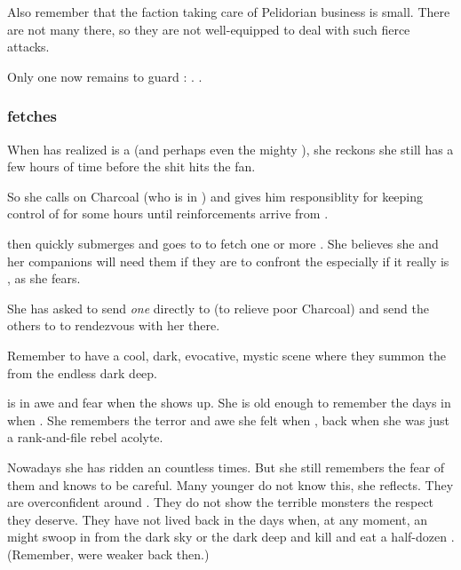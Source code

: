 Also remember that the faction taking care of Pelidorian business is small. 
There are not many \resphain there, so they are not well-equipped to deal with such fierce \dragon attacks.

Only one \resphan{} now remains to guard \Malcur: \Paerzim. 
. 





\subsubsection{\Achsah fetches \umbrae}
When \Achsah{} has realized \Takestsha{} is a \dragon{} (and perhaps even the mighty \Nzessuacrith), she reckons she still has a few hours of time before the shit hits the fan. 

So she calls on Charcoal (who is in \Forclin) and gives him responsiblity for keeping control of \Forclin{} for some hours until reinforcements arrive from \Malcur. 

\Achsah{} then quickly submerges and goes to \Nyx{} to fetch one or more \umbrae. 
She believes she and her companions will need them if they are to confront the \dragon\dash especially if it really is \Nzessuacrith, as she fears. 

She has asked \Teshrial{} to send \emph{one} \resphan{} directly to \Forclin{} (to relieve poor Charcoal) and send the others to \Nyx{} to rendezvous with her there. 

Remember to have a cool, dark, evocative, mystic scene where they summon the \umbrae{} from the endless dark deep. 

\Achsah{} is in awe and fear when the \umbra{} shows up. 
She is old enough to remember the days in \Merkyrah{} when . 
She remembers the terror and awe she felt when , back when she was just a rank-and-file rebel acolyte. 

Nowadays she has ridden an \umbra{} countless times. 
But she still remembers the fear of them and knows to be careful. 
Many younger \resphain{} do not know this, she reflects. 
They are overconfident around \umbrae.
They do not show the terrible monsters the respect they deserve. 
They have not lived back in the days when, at any moment, an \umbra{} might swoop in from the dark sky or the dark deep and kill and eat a half-dozen \resphain. 
(Remember, \resphain{} were weaker back then.)









